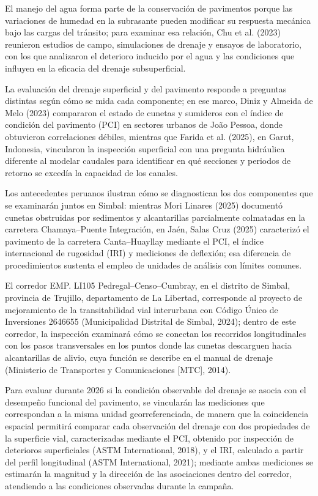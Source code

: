 \begingroup
\setlength{\emergencystretch}{2em}

El manejo del agua forma parte de la conservación de pavimentos porque las variaciones de humedad en la subrasante pueden modificar su respuesta mecánica bajo las cargas del tránsito; para examinar esa relación, Chu et al. (2023) reunieron estudios de campo, simulaciones de drenaje y ensayos de laboratorio, con los que analizaron el deterioro inducido por el agua y las condiciones que influyen en la eficacia del drenaje subsuperficial.

La evaluación del drenaje superficial y del pavimento responde a preguntas distintas según cómo se mida cada componente; en ese marco, Diniz y Almeida de Melo (2023) compararon el estado de cunetas y sumideros con el índice de condición del pavimento (PCI) en sectores urbanos de João Pessoa, donde obtuvieron correlaciones débiles, mientras que Farida et al. (2025), en Garut, Indonesia, vincularon la inspección superficial con una pregunta hidráulica diferente al modelar caudales para identificar en qué secciones y periodos de retorno se excedía la capacidad de los canales.

Los antecedentes peruanos ilustran cómo se diagnostican los dos componentes que se examinarán juntos en Simbal: mientras Mori Linares (2025) documentó cunetas obstruidas por sedimentos y alcantarillas parcialmente colmatadas en la carretera Chamaya–Puente Integración, en Jaén, Salas Cruz (2025) caracterizó el pavimento de la carretera Canta–Huayllay mediante el PCI, el índice internacional de rugosidad (IRI) y mediciones de deflexión; esa diferencia de procedimientos sustenta el empleo de unidades de análisis con límites comunes.

El corredor EMP. LI105 Pedregal–Censo–Cumbray, en el distrito de Simbal, provincia de Trujillo, departamento de La Libertad, corresponde al proyecto de mejoramiento de la transitabilidad vial interurbana con Código Único de Inversiones 2646655 (Municipalidad Distrital de Simbal, 2024); dentro de este corredor, la inspección examinará cómo se conectan los recorridos longitudinales con los pasos transversales en los puntos donde las cunetas descarguen hacia alcantarillas de alivio, cuya función se describe en el manual de drenaje (Ministerio de Transportes y Comunicaciones [MTC], 2014).

Para evaluar durante 2026 si la condición observable del drenaje se asocia con el desempeño funcional del pavimento, se vincularán las mediciones que correspondan a la misma unidad georreferenciada, de manera que la coincidencia espacial permitirá comparar cada observación del drenaje con dos propiedades de la superficie vial, caracterizadas mediante el PCI, obtenido por inspección de deterioros superficiales (ASTM International, 2018), y el IRI, calculado a partir del perfil longitudinal (ASTM International, 2021); mediante ambas mediciones se estimarán la magnitud y la dirección de las asociaciones dentro del corredor, atendiendo a las condiciones observadas durante la campaña.

